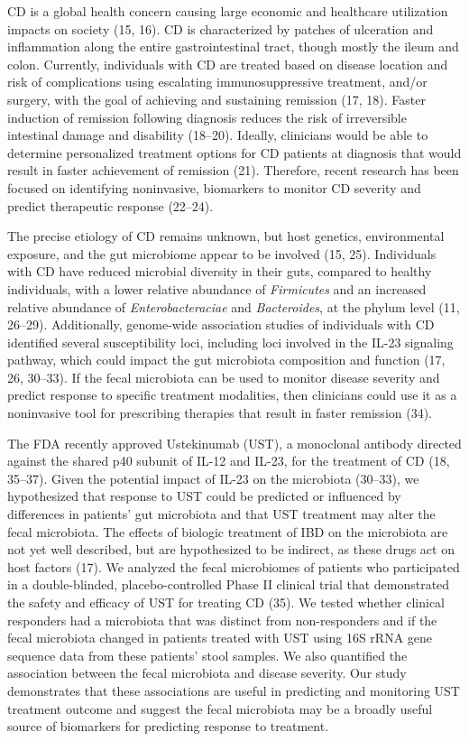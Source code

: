 \documentclass[12pt,]{article}
\begin{document}
CD is a global health concern causing large economic and healthcare
utilization impacts on society (15, 16). CD is characterized by patches
of ulceration and inflammation along the entire gastrointestinal tract,
though mostly the ileum and colon. Currently, individuals with CD are
treated based on disease location and risk of complications using
escalating immunosuppressive treatment, and/or surgery, with the goal of
achieving and sustaining remission (17, 18). Faster induction of
remission following diagnosis reduces the risk of irreversible
intestinal damage and disability (18--20). Ideally, clinicians would be
able to determine personalized treatment options for CD patients at
diagnosis that would result in faster achievement of remission (21).
Therefore, recent research has been focused on identifying noninvasive,
biomarkers to monitor CD severity and predict therapeutic response
(22--24).

The precise etiology of CD remains unknown, but host genetics,
environmental exposure, and the gut microbiome appear to be involved
(15, 25). Individuals with CD have reduced microbial diversity in their
guts, compared to healthy individuals, with a lower relative abundance
of \emph{Firmicutes} and an increased relative abundance of
\emph{Enterobacteraciae} and \emph{Bacteroides}, at the phylum level
(11, 26--29). Additionally, genome-wide association studies of
individuals with CD identified several susceptibility loci, including
loci involved in the IL-23 signaling pathway, which could impact the gut
microbiota composition and function (17, 26, 30--33). If the fecal
microbiota can be used to monitor disease severity and predict response
to specific treatment modalities, then clinicians could use it as a
noninvasive tool for prescribing therapies that result in faster
remission (34).

The FDA recently approved Ustekinumab (UST), a monoclonal antibody
directed against the shared p40 subunit of IL-12 and IL-23, for the
treatment of CD (18, 35--37). Given the potential impact of IL-23 on the
microbiota (30--33), we hypothesized that response to UST could be
predicted or influenced by differences in patients' gut microbiota and
that UST treatment may alter the fecal microbiota. The effects of
biologic treatment of IBD on the microbiota are not yet well described,
but are hypothesized to be indirect, as these drugs act on host factors
(17). We analyzed the fecal microbiomes of patients who participated in
a double-blinded, placebo-controlled Phase II clinical trial that
demonstrated the safety and efficacy of UST for treating CD (35). We
tested whether clinical responders had a microbiota that was distinct
from non-responders and if the fecal microbiota changed in patients
treated with UST using 16S rRNA gene sequence data from these patients'
stool samples. We also quantified the association between the fecal
microbiota and disease severity. Our study demonstrates that these
associations are useful in predicting and monitoring UST treatment
outcome and suggest the fecal microbiota may be a broadly useful source
of biomarkers for predicting response to treatment.
\end{document}
